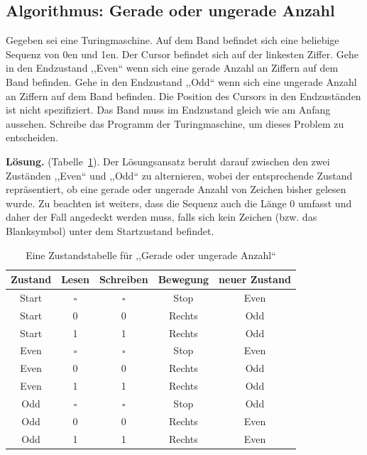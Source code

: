 \subsection{Algorithmus: Gerade oder ungerade Anzahl}
%
Gegeben sei eine Turingmaschine. Auf dem Band befindet sich eine beliebige Sequenz von 0en und 1en. Der Cursor befindet sich auf der linkesten Ziffer. Gehe in den Endzustand ,,Even`` wenn sich eine gerade Anzahl an Ziffern auf dem Band befinden. Gehe in den Endzustand ,,Odd`` wenn sich eine ungerade Anzahl an Ziffern auf dem Band befinden. Die Position des Cursors in den Endzuständen ist nicht spezifiziert. Das Band muss im Endzustand gleich wie am Anfang aussehen. Schreibe das Programm der Turingmaschine, um dieses Problem zu entscheiden.

\textbf{Lösung.} (Tabelle~\ref{tab:odd_even}). Der Lösungsansatz beruht darauf zwischen den zwei Zuständen ,,Even`` und ,,Odd`` zu alternieren, wobei der entsprechende Zustand repräsentiert, ob eine gerade oder ungerade Anzahl von Zeichen bisher gelesen wurde. Zu beachten ist weiters, dass die Sequenz auch die Länge $0$ umfasst und daher der Fall angedeckt werden muss, falls sich kein Zeichen (bzw. das Blanksymbol) unter dem Startzustand befindet.
%
\begin{table}
 \begin{center}
  \begin{tabular}{ccccc}
   \hline
    Zustand & Lesen     & Schreiben & Bewegung & neuer Zustand \\
   \hline \hline
    Start   & $\square$ & $\square$ & Stop     & Even \\
    Start   & 0         & 0         & Rechts   & Odd \\
    Start   & 1         & 1         & Rechts   & Odd \\
    Even    & $\square$ & $\square$ & Stop     & Even \\
    Even    & 0         & 0         & Rechts   & Odd \\
    Even    & 1         & 1         & Rechts   & Odd \\
    Odd     & $\square$ & $\square$ & Stop     & Odd \\
    Odd     & 0         & 0         & Rechts   & Even \\
    Odd     & 1         & 1         & Rechts   & Even \\
   \hline
  \end{tabular}
  \caption{Eine Zustandstabelle für ,,Gerade oder ungerade Anzahl``}
  \label{tab:odd_even}
 \end{center}
\end{table}

